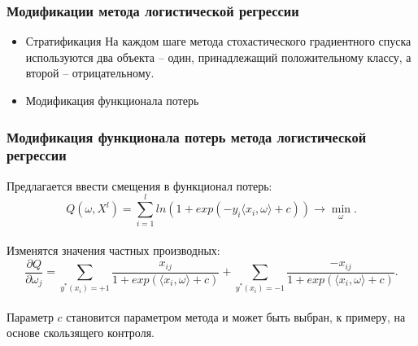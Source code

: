 \documentclass{beamer}
\begin{document}
\begin{frame}
\frametitle{Модификации метода логистической регрессии}
\begin{itemize}
	\item{Стратификация\newline 
		На каждом шаге метода стохастического градиентного спуска используются два объекта – один,
		принадлежащий положительному классу, а второй – отрицательному.
	}
	\item{Модификация функционала потерь}
\end{itemize}
\end{frame}

\begin{frame}
\frametitle{Модификация функционала потерь метода логистической регрессии}
	Предлагается ввести смещения в функционал потерь:
	$$Q(\omega, X^l)=\sum\limits_{i=1}^l ln(1+exp(-y_i\langle x_i,\omega \rangle +c))\rightarrow \min\limits_{\omega}.$$
	\\Изменятся значения частных производных:
	$$\frac{\partial Q}{\partial \omega_j}=\sum\limits_{y^*(x_i)=+1}\frac{x_{ij}}{1+exp(\langle x_i,\omega\rangle +c)}+\sum\limits_{y^*(x_i)=-1}\frac{-x_{ij}}{1+exp(\langle x_i,\omega\rangle +c)}.$$
	\\Параметр $c$ становится параметром метода и может быть выбран, к примеру, на основе скользящего контроля.
\end{frame}
\end{document}
